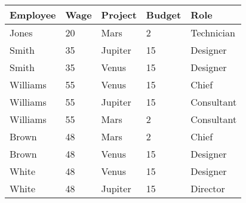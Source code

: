 \documentclass{article}
\begin{document}
	\begin{center}
		\begin{tabular}{lllll}
			\toprule
			\textbf{Employee} & \textbf{Wage} & \textbf{Project} & \textbf{Budget} & \textbf{Role} \\
			\midrule
			Jones    & 20   & Mars     & 2      & Technician \\
			Smith    & 35   & Jupiter  & 15     & Designer   \\
			Smith    & 35   & Venus    & 15     & Designer   \\
			Williams & 55   & Venus    & 15     & Chief      \\
			Williams & 55   & Jupiter  & 15     & Consultant \\
			Williams & 55   & Mars     & 2      & Consultant \\
			Brown    & 48   & Mars     & 2      & Chief      \\
			Brown    & 48   & Venus    & 15     & Designer   \\
			White    & 48   & Venus    & 15     & Designer   \\
			White    & 48   & Jupiter  & 15     & Director   \\
			\bottomrule
		\end{tabular}
	\end{center}
	
\end{document}
